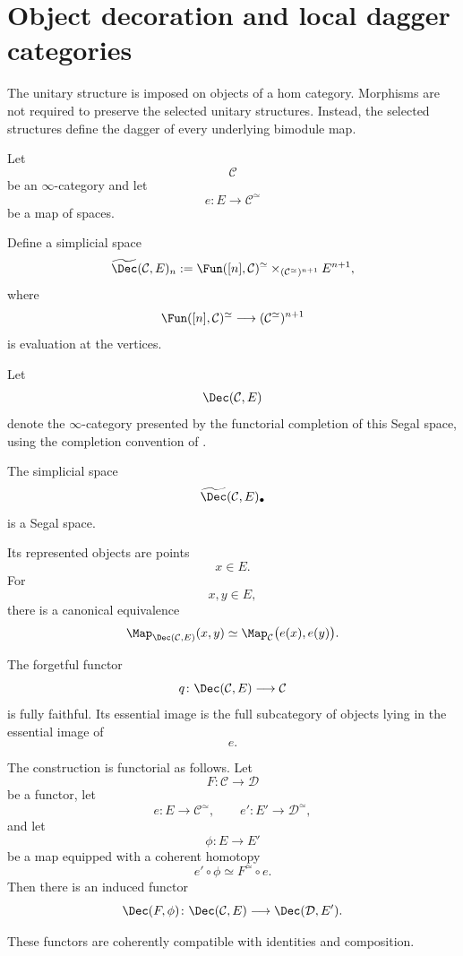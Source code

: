 \section{Object decoration and local dagger categories}
\label{sec:object-decoration-local-dagger}

The unitary structure is imposed on objects of a hom category. Morphisms
are not required to preserve the selected unitary structures. Instead,
the selected structures define the dagger of every underlying bimodule
map.

\begin{construction}
\label{con:object-decoration}
Let
\[
    \mathcal C
\]
be an $\infty$-category and let
\[
    e
    \colon
    E
    \longrightarrow
    \mathcal C^\simeq
\]
be a map of spaces.

Define a simplicial space
\[
    \widetilde{\Dec}(\mathcal C,E)_n
    :=
    \Fun([n],\mathcal C)^\simeq
    \times_{
        (\mathcal C^\simeq)^{n+1}
    }
    E^{n+1},
\]
where
\[
    \Fun([n],\mathcal C)^\simeq
    \longrightarrow
    (\mathcal C^\simeq)^{n+1}
\]
is evaluation at the vertices.

Let
\[
    \Dec(\mathcal C,E)
\]
denote the $\infty$-category presented by the functorial completion of
this Segal space, using the completion convention of
.
\end{construction}

\begin{proposition}
\label{prop:object-decoration-properties}
The simplicial space
\[
    \widetilde{\Dec}(\mathcal C,E)_\bullet
\]
is a Segal space.

Its represented objects are points
\[
    x\in E.
\]
For
\[
    x,y\in E,
\]
there is a canonical equivalence
\[
    \Map_{\Dec(\mathcal C,E)}(x,y)
    \simeq
    \Map_{\mathcal C}
    \bigl(
        e(x),
        e(y)
    \bigr).
\]

The forgetful functor
\[
    q
    \colon
    \Dec(\mathcal C,E)
    \longrightarrow
    \mathcal C
\]
is fully faithful. Its essential image is the full subcategory of
objects lying in the essential image of
\[
    e.
\]

The construction is functorial as follows. Let
\[
    F
    \colon
    \mathcal C
    \longrightarrow
    \mathcal D
\]
be a functor, let
\[
    e
    \colon
    E
    \longrightarrow
    \mathcal C^\simeq,
    \qquad
    e'
    \colon
    E'
    \longrightarrow
    \mathcal D^\simeq,
\]
and let
\[
    \phi
    \colon
    E
    \longrightarrow
    E'
\]
be a map equipped with a coherent homotopy
\[
    e'\circ\phi
    \simeq
    F^\simeq\circ e.
\]
Then there is an induced functor
\[
    \Dec(F,\phi)
    \colon
    \Dec(\mathcal C,E)
    \longrightarrow
    \Dec(\mathcal D,E').
\]

These functors are coherently compatible with identities and
composition.
\end{proposition}

